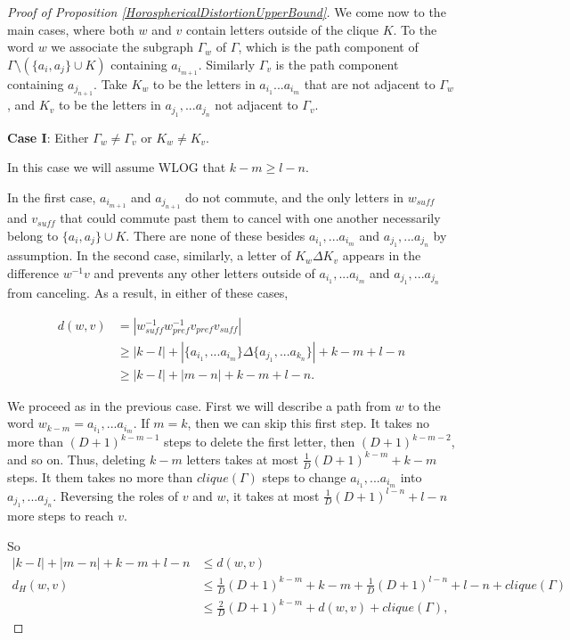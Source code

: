 \documentclass{amsart}
\theoremstyle{definition}
\theoremstyle{remark}
\begin{document}
\begin{proof} [Proof of Proposition \ref{HorosphericalDistortionUpperBound}]
		We come now to the main cases, where both $w$ and $v$ contain letters outside of the clique $K$. To the word $w$ we associate the subgraph $\Gamma_w$ of $\Gamma$, which is the path component of $\Gamma\setminus(\{a_i, a_j\}\cup K)$ containing $a_{i_{m+1}}$. Similarly $\Gamma_v$ is the path component containing $a_{j_{n+1}}$. Take $K_w$ to be the letters in $a_{i_1} ... a_{i_m}$ that are not adjacent to $\Gamma_w$, and $K_v$ to be the letters in $a_{j_1}, ... a_{j_n}$ not adjacent to $\Gamma_v$.
		
		\textbf{Case I}: Either $\Gamma_w\ne \Gamma_v$ or $K_w\ne K_v$.
		
		In this case we will assume WLOG that $k-m\ge l-n$.
		
		In the first case, $a_{i_{m+1}}$ and $a_{j_{n+1}}$ do not commute, and the only letters in $w_{suff}$ and $v_{suff}$ that could commute past them to cancel with one another necessarily belong to $\{a_i, a_j\}\cup K$. There are none of these besides $a_{i_1}, ... a_{i_m}$ and $a_{j_1}, ... a_{j_n}$ by assumption. In the second case, similarly, a letter of $K_w\Delta K_v$ appears in the difference $w^{-1}v$ and prevents any other letters outside of $a_{i_1}, ... a_{i_m}$ and $a_{j_1}, ... a_{j_n}$ from canceling. As a result, in either of these cases,
		
		\begin{align*}
		d(w,v)&=|w_{suff}^{-1}w_{pref}^{-1}v_{pref}v_{suff}|\\
		&\ge|k-l|+|\{a_{i_1}, ... a_{i_m}\}\Delta \{a_{j_1}, ... a_{k_n}\}|+k-m+l-n\\
		&\ge |k-l|+|m-n| +k-m+l-n.
		\end{align*}
		
		We proceed as in the previous case. First we will describe a path from $w$ to the word $w_{k-m}=a_{i_1},... a_{i_m}$. If $m=k$, then we can skip this first step. It takes no more than \newline $(D+1)^{k-m-1}$ steps to delete the first letter, then $(D+1)^{k-m-2}$, and so on. Thus, deleting $k-m$ letters takes at most $\frac{1}{D}(D+1)^{k-m}+k-m$ steps. It them takes no more than $clique(\Gamma)$ steps to change $a_{i_1}, ... a_{i_m}$ into $a_{j_1}, ... a_{j_n}$. Reversing the roles of $v$ and $w$, it takes at most $\frac{1}{D}(D+1)^{l-n}+l-n$ more steps to reach $v$.
		
		So 
		\begin{align}
			|k-l|+|m-n| +k-m+l-n&\le d(w,v)\\
			d_H(w,v)&\le \frac{1}{D}(D+1)^{k-m}+k-m+\frac{1}{D}(D+1)^{l-n}+l-n + clique(\Gamma)\\
			&\le \frac{2}{D}(D+1)^{k-m}+d(w,v)+ clique(\Gamma),
		\end{align}
		

\end{proof}
\end{document}
